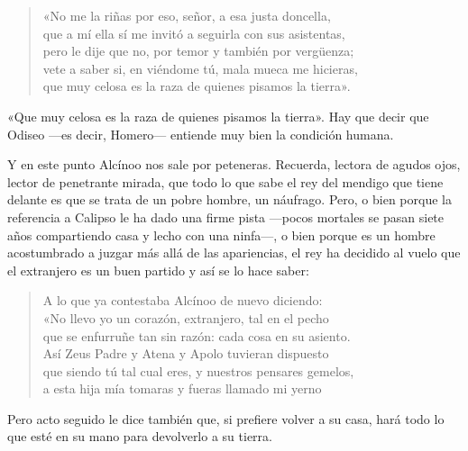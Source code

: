 \begin{verse}
«No me la riñas por eso, señor, a esa justa doncella,\\
que a mí ella sí me invitó a seguirla con sus asistentas,\\
pero le dije que no, por temor y también por vergüenza;\\
vete a saber si, en viéndome tú, mala mueca me hicieras,\\
que muy celosa es la raza de quienes pisamos la tierra».
\end{verse}

«Que muy celosa es la raza de quienes pisamos la tierra». Hay que decir que Odiseo ---es decir, Homero--- entiende muy bien la condición humana.

Y en este punto Alcínoo nos sale por peteneras. Recuerda, lectora de agudos ojos, lector de penetrante mirada, que todo lo que sabe el rey del mendigo que tiene delante es que se trata de un pobre hombre, un náufrago. Pero, o bien porque la referencia a Calipso le ha dado una firme pista ---pocos mortales se pasan siete años compartiendo casa y lecho con una ninfa---, o bien porque es un hombre acostumbrado a juzgar más allá de las apariencias, el rey ha decidido al vuelo que el extranjero es un buen partido y así se lo hace saber:

\begin{verse}
A lo que ya contestaba Alcínoo de nuevo diciendo:\\
«No llevo yo un corazón, extranjero, tal en el pecho\\
que se enfurruñe tan sin razón: cada cosa en su asiento.\\
Así Zeus Padre y Atena y Apolo tuvieran dispuesto\\
que siendo tú tal cual eres, y nuestros pensares gemelos,\\
a esta hija mía tomaras y fueras llamado mi yerno
\end{verse}

Pero acto seguido le dice también que, si prefiere volver a su casa, hará todo lo que esté en su mano para devolverlo a su tierra.

